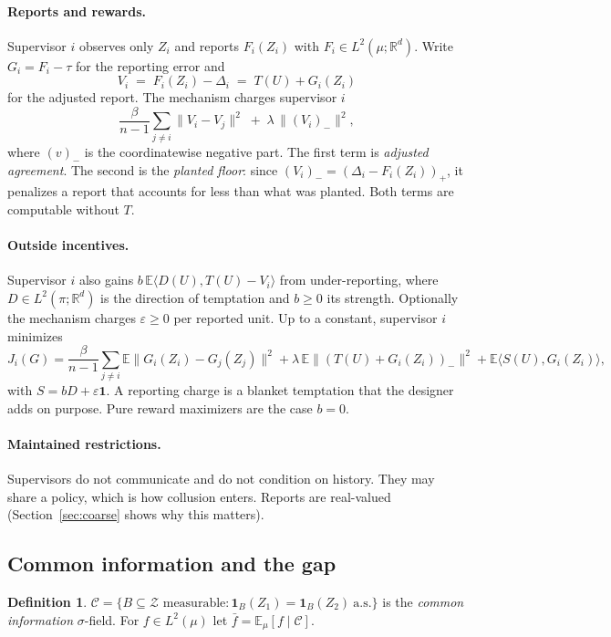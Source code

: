 \documentclass[11pt]{article}
\theoremstyle{definition}
\newtheorem{definition}{Definition}
\theoremstyle{remark}
\newcommand{\E}{\mathbb{E}}
\newcommand{\R}{\mathbb{R}}
\newcommand{\cC}{\mathcal{C}}
\newcommand{\cZ}{\mathcal{Z}}
\newcommand{\ip}[2]{\langle #1,#2\rangle}
\newcommand{\norm}[1]{\lVert #1\rVert}
\newcommand{\negp}[1]{(#1)_{-}}
\newcommand{\posp}[1]{(#1)_{+}}
\begin{document}
\paragraph{Reports and rewards.} Supervisor $i$ observes only $Z_i$ and reports $F_i(Z_i)$ with $F_i\in L^2(\mu;\R^d)$. Write $G_i=F_i-\tau$ for the reporting error and
\[
V_i \;=\; F_i(Z_i)-\Delta_i \;=\; T(U)+G_i(Z_i)
\]
for the adjusted report. The mechanism charges supervisor $i$
\begin{equation}\label{eq:reward}
\frac{\beta}{n-1}\sum_{j\ne i}\norm{V_i-V_j}^2\;+\;\lambda\,\norm{\negp{V_i}}^2,
\end{equation}
where $\negp{v}$ is the coordinatewise negative part. The first term is \emph{adjusted agreement}. The second is the \emph{planted floor}: since $\negp{V_i}=\posp{\Delta_i-F_i(Z_i)}$, it penalizes a report that accounts for less than what was planted. Both terms are computable without $T$.

\paragraph{Outside incentives.} Supervisor $i$ also gains $b\,\E\ip{D(U)}{T(U)-V_i}$ from under-reporting, where $D\in L^2(\pi;\R^d)$ is the direction of temptation and $b\ge0$ its strength. Optionally the mechanism charges $\varepsilon\ge 0$ per reported unit. Up to a constant, supervisor $i$ minimizes
\begin{equation}\label{eq:cost}
J_i(G)=\frac{\beta}{n-1}\sum_{j\ne i}\E\norm{G_i(Z_i)-G_j(Z_j)}^2+\lambda\,\E\norm{\negp{T(U)+G_i(Z_i)}}^2+\E\ip{S(U)}{G_i(Z_i)},
\end{equation}
with $S=bD+\varepsilon\mathbf 1$. A reporting charge is a blanket temptation that the designer adds on purpose. Pure reward maximizers are the case $b=0$.

\paragraph{Maintained restrictions.} Supervisors do not communicate and do not condition on history. They may share a policy, which is how collusion enters. Reports are real-valued (Section~\ref{sec:coarse} shows why this matters).

\subsection{Common information and the gap}

\begin{definition}\label{d:common}
$\cC=\{B\subseteq\cZ \text{ measurable}: \mathbf 1_B(Z_1)=\mathbf 1_B(Z_2)\ \text{a.s.}\}$ is the \emph{common information} $\sigma$-field. For $f\in L^2(\mu)$ let $\bar f=\E_\mu[f\mid\cC]$.
\end{definition}
\end{document}
